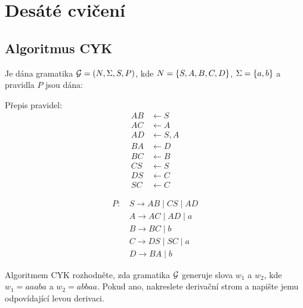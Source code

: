 \section{Desáté cvičení}

\subsection{Algoritmus CYK} %
Je dána gramatika $\mathcal{G} = (N, \Sigma, S, P)$, kde
$N = \left\lbrace S, A, B, C, D \right\rbrace$, $\Sigma = \left\lbrace a, b \right\rbrace$ a pravidla $P$ jsou dána:
\begin{multicols}{2}

    Přepis pravidel:
    \begin{align*}
        AB & \leftarrow S \\
        AC & \leftarrow A \\
        AD & \leftarrow S, A \\
        BA & \leftarrow D \\
        BC & \leftarrow B \\
        CS & \leftarrow S \\
        DS & \leftarrow C \\
        SC & \leftarrow C
    \end{align*}

\columnbreak

    \begin{align*}
        P \text{: } & S \rightarrow AB \mid CS \mid AD \\
        & A \rightarrow AC \mid AD \mid a \\
        & B \rightarrow BC \mid b \\
        & C \rightarrow DS \mid SC \mid a \\
        & D \rightarrow BA \mid b
    \end{align*}
\end{multicols}
Algoritmem CYK rozhodněte, zda gramatika $\mathcal{G}$ generuje slova $w_1$ a $w_2$, kde $w_1 = aaaba$ a $w_2 = abbaa$.
Pokud ano, nakreslete derivační strom a napište jemu odpovídající levou derivaci.

